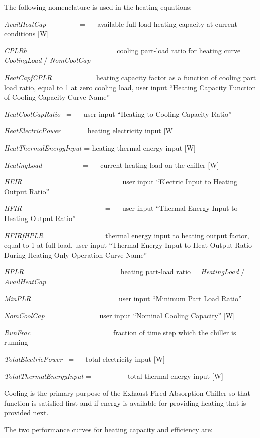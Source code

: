 The following nomenclature is used in the heating equations:

\emph{AvailHeatCap}~~~~~~~~~ = ~~ available full-load heating capacity at current conditions {[}W{]}

\emph{CPLRh}~~~~~~~~~~~~~~~~~~~~ = ~~ cooling part-load ratio for heating curve = \emph{CoolingLoad} / \emph{NomCoolCap}

\emph{HeatCapfCPLR}~~~~~~~ = ~~ heating capacity factor as a function of cooling part load ratio, equal to 1 at zero cooling load, user input ``Heating Capacity Function of Cooling Capacity Curve Name''

\emph{HeatCoolCapRatio~} = ~~ user input ``Heating to Cooling Capacity Ratio''

\emph{HeatElectricPower}~~ = ~~ heating electricity input {[}W{]}

\emph{HeatThermalEnergyInput} = heating thermal energy input {[}W{]}

\emph{HeatingLoad}~~~~~~~~~~~ = ~~ current heating load on the chiller {[}W{]}

\emph{HEIR}~~~~~~~~~~~~~~~~~~~~~~~ = ~~ user input ``Electric Input to Heating Output Ratio''

\emph{HFIR}~~~~~~~~~~~~~~~~~~~~~~~ = ~~ user input ``Thermal Energy Input to Heating Output Ratio''

\emph{HFIRfHPLR}~~~~~~~~~~~~ = ~~ thermal energy input to heating output factor, equal to 1 at full load, user input ``Thermal Energy Input to Heat Output Ratio During Heating Only Operation Curve Name''

\emph{HPLR}~~~~~~~~~~~~~~~~~~~~~~ = ~~ heating part-load ratio = \emph{HeatingLoad} / \emph{AvailHeatCap}

\emph{MinPLR~~~~~~~~~~~~~~~~~~~} = ~~ user input ``Minimum Part Load Ratio''

\emph{NomCoolCap}~~~~~~~~~~ = ~~ user input ``Nominal Cooling Capacity'' {[}W{]}

\emph{RunFrac}~~~~~~~~~~~~~~~~~~ = ~~ fraction of time step which the chiller is running

\emph{TotalElectricPower~} = ~~ total electricity input {[}W{]}

\emph{TotalThermalEnergyInput} = ~~~~~~~~~ total thermal energy input {[}W{]}

Cooling is the primary purpose of the Exhaust Fired Absorption Chiller so that function is satisfied first and if energy is available for providing heating that is provided next.

The two performance curves for heating capacity and efficiency are:

